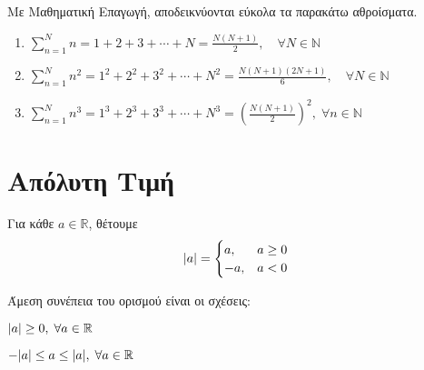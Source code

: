 \documentclass[main.tex]{subfiles}
\begin{document}
\begin{example}
  Με Μαθηματική Επαγωγή, αποδεικνύονται εύκολα τα παρακάτω αθροίσματα.
  \begin{enumerate}[wide,labelindent=0pt]
    \item $ \sum_{n=1}^{N} n = 1+2+3+\cdots+N = \frac{N(N+1)}{2}, 
      \quad \forall N \in \mathbb{N}  $
    \item $ \sum_{n=1}^{N} n^{2} =1^{2}+2^{2}+3^{2}+\cdots+N^{2} = 
      \frac{N(N+1)(2N+1)}{6}, \quad \forall N \in \mathbb{N} $
    \item $ \sum_{n=1}^{N} n^{3} = 1^{3}+2^{3}+3^{3}+\cdots +N^{3} =
      \left(\frac{N(N+1)}{2}
      \right)^{2}, \; \forall n \in \mathbb{N}$
  \end{enumerate}
\end{example}

\section{Απόλυτη Τιμή}

\begin{dfn}
Για κάθε $ a \in \mathbb{R} $, θέτουμε
\[ \abs{a} = \begin{cases} a, & a \geq 0 \\ -a, & a < 0 \end{cases}  \]
\end{dfn}

\begin{rem}
  Άμεση συνέπεια του ορισμού είναι οι σχέσεις:
  \begin{myitemize}
    \item $ \abs{a} \geq 0, \;  \forall a \in \mathbb{R} $
    \item $ -\abs{a} \leq a \leq \abs{a}, \; \forall a \in \mathbb{R} $
  \end{myitemize}
\end{rem}
\end{document}
